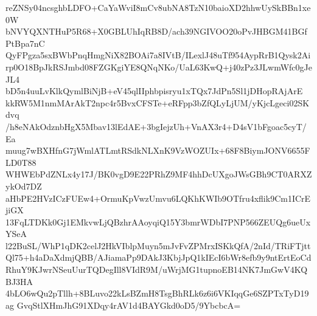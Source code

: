 reZNSy04ncsghbLDFO+CaYaWviI8mCv8ubNA8TzN10baioXD2hhwUySkBBn1xe0W
bNVYQXNTHuP5R68+X0GBLUhIqRB8D/ach39NGIVOO20oPvJHBGM41BGfPtBpa7nC
QyFPgza5sxBWbPnqHmgNiX82BOAi7a8IVtB/ILexlJ48uTf954AypRrB1Qysk2Ai
rp0O18BpJkRSJmbd08FZGKgiYE8QNqNKo/UaL63KwQ+j40zPz3JLwmWfc0gJeJL4
bD5n4uuLvKlkQymlBiNjB+eV45qlIIphbpisryu1xTQx7JdPn5Sl1jDHopRAjArE
kkRW5M1nmMArAkT2npc4r5BvxCFSTe+eRFpp3bZfQLyLjUM/yKjcLgeci02SKdvq
/h8eNAkOdznbHgX5Mbav13lEdAE+3bgIejzUh+VnAX3r4+D4sV1bFgoac5cyT/Ea
muug7wBXHfnG7jWmlATLmtRSdkNLXnK9VzWOZUIx+68F8BiymJONV6655FLD0T88
WHWEbPdZNLx4y17J/BK0vgD9E22PRhZ9MF4hhDcUXgoJWsGBh9CT0ARXZykOd7DZ
aHbPE2HVzICzFUEw4+OrmuKpVwzUmvu6LQKhKWIb9OTfru4xflik9Cm1ICrEjiGX
13FqLTDKk0Gj1EMkvwLjQBzhrAAoyqiQ15Y3bmrWDbI7PNP566ZEUQg6ueUxYSeA
l22BuSL/WhP1qDK2celJ2HkVIblpMuyn5mJvFvZPMrxISKkQfA/2nId/TRiFTjtt
Ql75+h4aDaXdmjQBB/AJiamaPp9DAkJ3KbjJpQ1kIEcI6bWr8efb9y9ntErtEoCd
RhuY9KJwrNSeuUurTQDegIll8VIdR9M/uWrjMG1tupnoEB14NK7JmGwV4KQBJ3HA
4bLO6wQu2pTllh+8BLuvo22kLsBZmH8TsgBhRLk6z6i6VKIqqGe6SZPTxTyD19ag
GvqStlXHmJhG91XDqy4rAV1d4BAYGkd0oD5/9YbcbcA=

